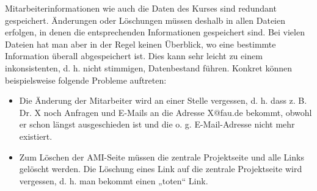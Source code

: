 \documentclass{lehramt-informatik-haupt}
\begin{document}
\begin{enumerate}
\begin{antwort}[muster]
Mitarbeiterinformationen wie auch die Daten des Kurses sind redundant
gespeichert. Änderungen oder Löschungen müssen deshalb in allen Dateien
erfolgen, in denen die entsprechenden Informationen gespeichert sind.
Bei vielen Dateien hat man aber in der Regel keinen Überblick, wo eine
bestimmte Information überall abgespeichert ist. Dies kann sehr leicht
zu einem inkonsistenten, d. h. nicht stimmigen, Datenbestand führen.
Konkret können beispielsweise folgende Probleme auftreten:

\begin{itemize}
\item Die Änderung der Mitarbeiter wird an einer Stelle vergessen, d. h.
dass z. B. Dr. X noch Anfragen und E-Mails an die Adresse X@fau.de
bekommt, obwohl er schon längst ausgeschieden ist und die o. g.
E-Mail-Adresse nicht mehr existiert.

\item Zum Löschen der AMI-Seite müssen die zentrale Projektseite und
alle Links gelöscht werden. Die Löschung eines Link auf die zentrale
Projektseite wird vergessen, d. h. man bekommt einen „toten“ Link.
\end{itemize}
\end{antwort}
\end{enumerate}

\literatur
\end{document}
